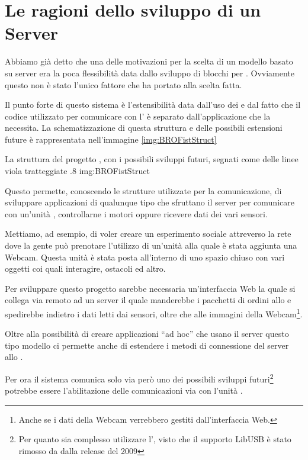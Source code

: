 \section{Le ragioni dello sviluppo di un Server}
Abbiamo già detto che una delle motivazioni per la scelta di un modello
basato su server era la poca flessibilità data dallo sviluppo di blocchi
per . Ovviamente questo non è stato l'unico fattore che ha
portato alla scelta fatta.

Il punto forte di questo sistema è l'estensibilità data dall'uso dei
 e dal fatto che il codice utilizzato per comunicare
con l' è separato dall'applicazione che la necessita. La
schematizzazione di questa struttura e delle possibili estensioni future è
rappresentata nell'immagine \ref{img:BROFistStruct}

        {La struttura del progetto \BROFist{}, con i possibili sviluppi
        futuri, segnati come delle linee viola tratteggiate}
        {.8}
        {img:BROFistStruct}

Questo permette, conoscendo le strutture utilizzate per la comunicazione,
di sviluppare applicazioni di qualunque tipo che sfruttano il server per
comunicare con un'unità \SPAM{}, controllarne i motori oppure ricevere dati
dei vari sensori.

Mettiamo, ad esempio, di voler creare un esperimento sociale attreverso la
rete dove la gente può prenotare l'utilizzo di un'unità \SPAM{} alla quale
è stata aggiunta una Webcam. Questa unità è stata posta all'interno di uno
spazio chiuso con vari oggetti coi quali interagire, ostacoli ed altro.

Per sviluppare questo progetto sarebbe necessaria un'interfaccia Web la
quale si collega via remoto ad un server \BROFist{} il quale manderebbe i
pacchetti di ordini allo \SPAM{} e spedirebbe indietro i dati letti dai
sensori, oltre che alle immagini della Webcam\footnote{Anche se i dati
della Webcam verrebbero gestiti dall'interfaccia Web.}.

Oltre alla possibilità di creare applicazioni ``ad hoc'' che usano il
server \BROFist{} questo tipo modello ci permette anche di estendere i
metodi di connessione del server allo \SPAM{}.

Per ora il sistema comunica solo via  però uno dei
possibili sviluppi futuri\footnote{Per quanto sia complesso utilizzare
l', visto che il supporto LibUSB è stato rimosso da
\nxtOSEK{} dalla release del 2009} potrebbe essere l'abilitazione delle
comunicazioni via  con l'unità .

